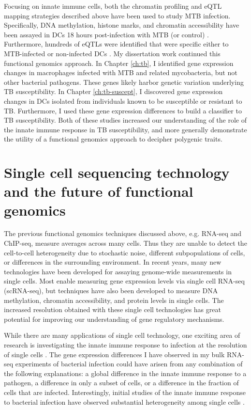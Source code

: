 Focusing on innate immune cells, both the chromatin profiling and eQTL
mapping strategies described above have been used to study MTB
infection. Specifically, DNA methylation, histone marks, and chromatin
accessibility have been assayed in DCs 18 hours post-infection with
MTB (or control) \citep{Pacis2015}. Furthermore, hundreds of eQTLs
were identified that were specific either to MTB-infected or
non-infected DCs \citep{Barreiro2012}. My dissertation work continued
this functional genomics approach. In Chapter \ref{ch:tb}, I
identified gene expression changes in macrophages infected with MTB
and related mycobacteria, but not other bacterial pathogens. These
genes likely harbor genetic variation underlying TB susceptibility. In
Chapter \ref{ch:tb-suscept}, I discovered gene expression changes in
DCs isolated from individuals known to be susceptible or resistant to
TB. Furthermore, I used these gene expression differences to build a
classifier to TB susceptibility. Both of these studies increased our
understanding of the role of the innate immune response in TB
susceptibility, and more generally demonstrate the utility of a
functional genomics approach to decipher polygenic traits.


\section{Single cell sequencing technology and the future of functional genomics}

The previous functional genomics techniques discussed above,
e.g. RNA-seq and ChIP-seq, measure averages across many cells. Thus
they are unable to detect the cell-to-cell heterogeneity due to
stochastic noise, different subpopulations of cells, or differences in
the surrounding environment. In recent years, many new technologies
have been developed for assaying genome-wide measurements in single
cells. Most enable measuring gene expression levels via single cell
RNA-seq (scRNA-seq), but techniques have also been developed to
measure DNA methylation, chromatin accessibility, and protein levels
\citep{Genshaft2016} in single cells. The increased resolution
obtained with these single cell technologies has great potential for
improving our understanding of gene regulatory mechanisms.

While there are many applications of single cell technology, one
exciting area of research is investigating the innate immune response
to infection at the resolution of single cells \citep{Satija2014,
 Proserpio2016}. The gene expression differences I have observed in
my bulk RNA-seq experiments of bacterial infection could have arisen
from any combination of the following explanations: a global
difference in the innate immune response to a pathogen, a difference
in only a subset of cells, or a difference in the fraction of cells
that are infected. Interestingly, initial studies of the innate immune
response to bacterial infection have observed substantial
heterogeneity among single cells \citep{Shalek2013, Avraham2015}.

